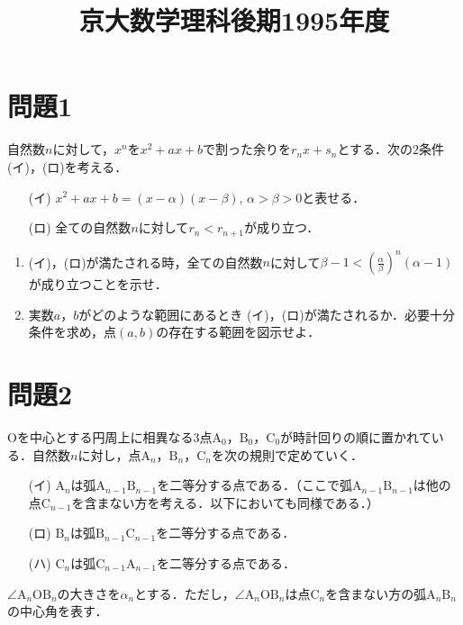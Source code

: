 \documentclass[unicode,12pt, A4j]{ltjsarticle}%
\title{京大数学理科後期1995年度}
\author{}
\date{}
\begin{document}
\maketitle

\section{問題1}
自然数$n$に対して，$x^n$を$x^2+ax+b$で割った余りを$r_nx+s_n$とする．次の$2$条件(イ)，(ロ)を考える．

\begin{itemize}
 \item[(イ)] $x^2+ax+b=(x-\alpha)(x-\beta),\, \alpha>\beta>0$と表せる．
 \item[(ロ)] 全ての自然数$n$に対して$r_n<r_{n+1}$が成り立つ．
\end{itemize}

\begin{enumerate}
 \item (イ)，(ロ)が満たされる時，全ての自然数$n$に対して${\displaystyle \beta-1<\left(\frac{\alpha}{\beta}\right)^n(\alpha-1)}$が成り立つことを示せ．
 \item 実数$a$，$b$がどのような範囲にあるとき (イ)，(ロ)が満たされるか．必要十分条件を求め，点$(a,b)$の存在する範囲を図示せよ．
\end{enumerate}


\section{問題2}
$\mathrm{O}$を中心とする円周上に相異なる$3$点$\mathrm{A}_0$，$\mathrm{B}_0$，$\mathrm{C}_0$が時計回りの順に置かれている．自然数$n$に対し，点$\mathrm{A}_n$，$\mathrm{B}_n$，$\mathrm{C}_n$を次の規則で定めていく．
\begin{itemize}
 \item[(イ)] $\mathrm{A}_n$は弧$\mathrm{A}_{n-1}\mathrm{B}_{n-1}$を二等分する点である．（ここで弧$\mathrm{A}_{n-1}\mathrm{B}_{n-1}$は他の点$\mathrm{C}_{n-1}$を含まない方を考える．以下においても同様である．）
 \item[(ロ)] $\mathrm{B}_n$は弧$\mathrm{B}_{n-1}\mathrm{C}_{n-1}$を二等分する点である．
 \item[(ハ)] $\mathrm{C}_n$は弧$\mathrm{C}_{n-1}\mathrm{A}_{n-1}$を二等分する点である．
\end{itemize}

$\angle \mathrm{A}_n\mathrm{OB}_n$の大きさを$\alpha_n$とする．ただし，$\angle \mathrm{A}_n\mathrm{OB}_n$は点$\mathrm{C}_n$を含まない方の弧$\mathrm{A}_n\mathrm{B}_n$の中心角を表す．
\end{document}
